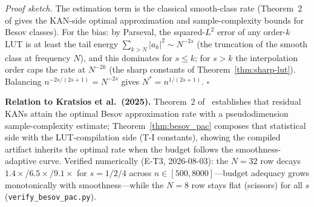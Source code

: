 \vspace{2pt}
\noindent\textit{Proof sketch.}
The estimation term is the classical smooth-class rate
(Theorem~2 of \cite{kratsios2025reskan} gives the KAN-side optimal
approximation and sample-complexity bounds for Besov classes). For the
bias: by Parseval, the squared-$L^2$ error of any order-$k$ LUT is at
least the tail energy $\sum_{k > N} |a_k|^2 \sim N^{-2s}$ (the
truncation of the smooth class at frequency $N$), and this dominates
for $s \leq k$; for $s > k$ the interpolation order caps the rate at
$N^{-2k}$ (the sharp constants of Theorem~\ref{thm:sharp-lut}).
Balancing $n^{-2s/(2s+1)} = N^{-2s}$ gives $N^{*} = n^{1/(2s+1)}$.
$\square$

\vspace{2pt}
\noindent\textbf{Relation to Kratsios et al.\ (2025).}
Theorem~2 of~\cite{kratsios2025reskan} establishes that residual KANs
attain the optimal Besov approximation rate with a pseudodimension
sample-complexity estimate; Theorem~\ref{thm:besov_pac} composes that
statistical side with the LUT-compilation side (T-I constants), showing
the compiled artifact inherits the optimal rate when the budget follows
the smoothness-adaptive curve. Verified numerically (E-T3, 2026-08-03):
the $N{=}32$ row decays $1.4\times$/$6.5\times$/$9.1\times$ for
$s = 1/2/4$ across $n \in [500, 8000]$---budget adequacy grows
monotonically with smoothness---while the $N{=}8$ row stays flat
(scissors) for all $s$ (\texttt{verify\_besov\_pac.py}).
